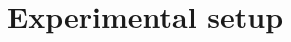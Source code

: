 \documentclass{cshonours}
\begin{document}
\section{Experimental setup}
\label{sec:dimensions}

\end{document}

